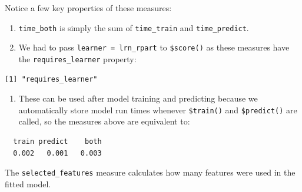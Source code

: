 Notice a few key properties of these measures:

\begin{enumerate}
\def\labelenumi{\arabic{enumi})}
\tightlist
\item
  \texttt{time\_both} is simply the sum of \texttt{time\_train} and
  \texttt{time\_predict}.
\item
  We had to pass \texttt{learner\ =\ lrn\_rpart} to \texttt{\$score()}
  as these measures have the \texttt{requires\_learner} property:
\end{enumerate}

\begin{Shaded}
\begin{Highlighting}[]
\NormalTok{(}\NormalTok{)}\SpecialCharTok{$}
\end{Highlighting}
\end{Shaded}

\begin{verbatim}
[1] "requires_learner"
\end{verbatim}

\begin{enumerate}
\def\labelenumi{\arabic{enumi})}
\setcounter{enumi}{2}
\tightlist
\item
  These can be used after model training and predicting because we
  automatically store model run times whenever \texttt{\$train()} and
  \texttt{\$predict()} are called, so the measures above are equivalent
  to:
\end{enumerate}

\begin{Shaded}
\begin{Highlighting}[]
\SpecialCharTok{$} \SpecialCharTok{$}
\end{Highlighting}
\end{Shaded}

\begin{verbatim}
  train predict    both 
  0.002   0.001   0.003 
\end{verbatim}

The \texttt{selected\_features} measure calculates how many features
were used in the fitted model.

\begin{Shaded}
\begin{Highlighting}[]
\OtherTok{=} \NormalTok{(}\NormalTok{)}
\end{Highlighting}
\end{Shaded}

